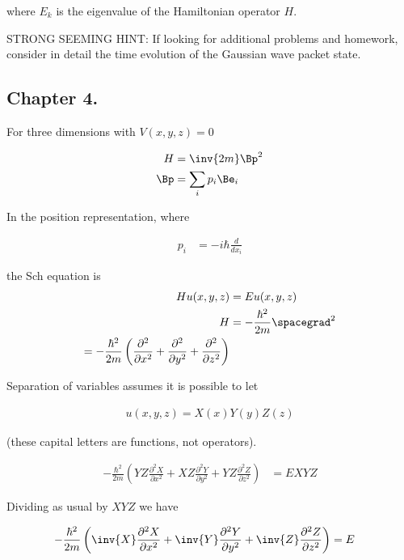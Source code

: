 where $E_k$ is the eigenvalue of the Hamiltonian operator $H$.

STRONG SEEMING HINT: If looking for additional problems and homework, consider in detail the time evolution of the Gaussian wave packet state.

\subsection{Chapter 4.}

For three dimensions with $V(x,y,z) = 0$

\begin{align*}
H &= \inv{2m} \Bp^2 \\
\Bp &= \sum_i p_i \Be_i \\
\end{align*}

In the position representation, where

\begin{align*}
p_i &= -i \hbar \frac{d}{dx_i}
\end{align*}

the Sch equation is
\begin{align*}
H u(x,y,z) &= E u(x,y,z) \\
H &= -\frac{\hbar^2}{2m} \spacegrad^2 \\
= -\frac{\hbar^2}{2m} \left( 
\frac{\partial^2}{\partial {x}^2}
+\frac{\partial^2}{\partial {y}^2}
+\frac{\partial^2}{\partial {z}^2}
\right) 
\end{align*}

Separation of variables assumes it is possible to let

\begin{align*}
u(x,y,z) = X(x) Y(y) Z(z)
\end{align*}

(these capital letters are functions, not operators).

\begin{align*}
-\frac{\hbar^2}{2m} \left( 
YZ \frac{\partial^2 X}{\partial {x}^2}
+ XZ \frac{\partial^2 Y}{\partial {y}^2}
+ YZ \frac{\partial^2 Z}{\partial {z}^2}\right)
&= E X Y Z
\end{align*}

Dividing as usual by $XYZ$ we have

\begin{align*}
-\frac{\hbar^2}{2m} \left( 
\inv{X} \frac{\partial^2 X}{\partial {x}^2}
+ \inv{Y} \frac{\partial^2 Y}{\partial {y}^2}
+ \inv{Z} \frac{\partial^2 Z}{\partial {z}^2} \right)
&= E 
\end{align*}

